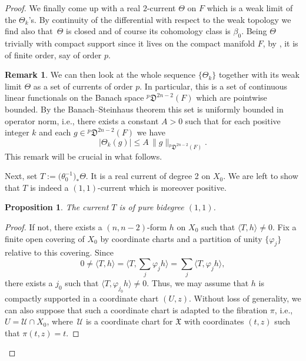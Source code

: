 \documentclass[11pt]{article}
\newcommand{\ie}{i.e.,\xspace}
\let\mathcal\mathscr
\theoremstyle{plain}
\newtheorem{proposition}[theorem]{Proposition}
\theoremstyle{definition}
\newtheorem{remark}[theorem]{Remark}
\begin{document}
\begin{appendix}
\begin{proof}
We finally come up with a real $2$-current $\Theta$ on $F$ which is a weak limit of the $\Theta_k$'s. By continuity of the differential with respect to the weak topology we find also that~$\Theta$ is closed and of course its cohomology class is $\beta_0$. Being $\Theta$ trivially with compact support since it lives on the compact manifold $F$, by \cite[Cor.\ on p.\,43]{dRh84}, it is of finite order, say of order $p$.

\begin{remark}\label{rk:BS}
We can then look at the whole sequence $\{\Theta_k\}$ together with its weak limit $\Theta$ as a set of currents of order $p$. In particular, this is a set of continuous linear functionals on the Banach space $^p\mathfrak D^{2n-2}(F)$ which are pointwise bounded. By the Banach--Steinhaus theorem this set is uniformly bounded in operator norm, \ie there exists a constant $A>0$ such that for each positive integer $k$ and each $g\in{}^p\mathfrak D^{2n-2}(F)$ we have
\[
|\Theta_k(g)|\le A\, \|g\|_{^p\mathfrak D^{2n-2}(F)}.
\]
This remark will be crucial in what follows.
\end{remark}

Next, set $T:=\bigl(\theta_0^{-1}\bigr)_*\Theta$. It is a real current of degree 2 on $X_0$. We are left to show that $T$ is indeed a $(1,1)$-current which is moreover positive.

\begin{proposition}
The current $T$ is of pure bidegree $(1,1)$.
\end{proposition}

\begin{proof}
If not, there exists a $(n,n-2)$-form $h$ on $X_0$ such that $\langle T,h\rangle\ne 0$. Fix a finite open covering of $X_0$ by coordinate charts and a partition of unity $\{\varphi_j\}$ relative to this covering. Since
\[
0\ne\langle T,h\rangle=\bigl\langle T,{\textstyle\sum_j\varphi_jh}\bigr\rangle=\sum_j\langle T,\varphi_jh\rangle,
\]
there exists a $j_0$ such that $\langle T,\varphi_{j_0}h\rangle\ne 0$. Thus, we may assume that $h$ is compactly supported in a coordinate chart $(U,z)$. Without loss of generality, we can also suppose that such a coordinate chart is adapted to the fibration $\pi$, \ie $U=\mathcal U\cap X_0$, where~$\mathcal U$ is a coordinate chart for $\mathfrak X$ with coordinates $(t,z)$ such that $\pi(t,z)=t$.


\end{proof}
\end{proof}
\end{appendix}
\end{document}
